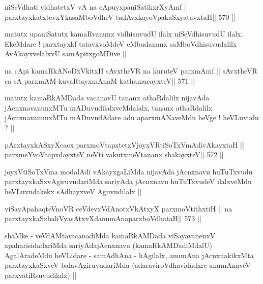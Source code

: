 \begin{shl}
niSeVdhati vidhatetxV vA na cApuyxpaniSatikxrXyAmf ||
parxtayxkatxtevxYkasaMboVdheV tadAvxkayoVpakaSxyatavxtaH\hfill || 570 ||
\end{shl}

\begin{artha}
matutx upaniSatutx kamaRvanunx vidhisuvudU ilalx niSeVdhisuvudU ilalx,
EkeMdare ! parxtayxkf tatavxvoMdeV eMbudanunx saMboVdhisuvudalilx
AvAkayxvelalxvU samApitxgoMDive ||
\end{artha}

\begin{shl}
na cApi kamaRkANoDxVkitxH sAvxtheVR na kuruteV parxmAmf ||
sAvxtheVR ca sA parxmAM kuvaRtayxmAnaM kathamucayxteV\hfill || 571 ||
\end{shl}

\begin{artha}
matutx kamaRkAMDada vacanavU tananx athaRdalilx nijavAda
jAcnxnavanunxMTu mADuvudilalxveMdalalx, tananx athaRdalilx
jAcnxnavanunxMTu mADuvudAdare adu aparxmANaveMdu heVge ! heVLuvudu ? ||
\end{artha}

\begin{shl}
pArxtayxkASxyXcacx parxmoVtapxtetxVjoyxVRtiSoTxVmAdivAkayxtaH ||
parxmeYvoVtapxdayxteV neVti vakutxmeVtananx shakayxteV\hfill || 572 ||
\end{shl}

\begin{artha}
joyxVtiSoTxVma modalAdi vAkayxgaLiMda nijavAda jAcnxnavu huTuTxvudu
parxtayxkaSxvAgiruvudariMda sariyAda jAcnxnavu huTuTxvudeV ilalxveMdu
heVLuvudakekx sAdhayxveV Aguvudilalx ||
\end{artha}

\begin{shl}
viSayApahaqteVnoVR ceVdevxVdAnotxVkAtxyX parxmoVtithxtiH ||
na parxtayxkaSxbaliVyasAtxvXdanumAnaparxboVdhataH\hfill || 573 ||
\end{shl}

\begin{artha}
shaMke - veVdAMtavacanadiMda kamaRkAMDada viSayavanenxV
apaharisidadxriMda sariyAdajAcnxnavu (kamaRkAMDadiMdalU) AgalAradeMdu
heVLidare - samAdhAna - hAgilalx, anumAna jAcnxnakikxMta
parxtayxkaSxveV balavAgiruvudariMda (adaraviroVdhavidadxre anumAnaveV
parxvatiRsuvudilalx) ||
\end{artha}
